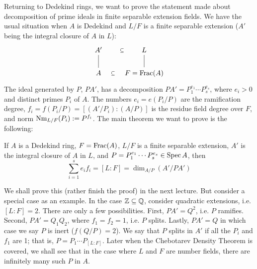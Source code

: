 Returning to Dedekind rings, we want to prove the statement made about decomposition of prime ideals in finite separable extension fields. We have the usual situation when $A$ is Dedekind and $L/F$ is a finite separable extension ($A'$ being the integral closure of $A$ in $L$):
	\[
	\begin{tikzcd}
	A' \arrow[draw=none]{r}[sloped,auto=false]{\subseteq} \arrow[dash]{d} & L \arrow[dash]{d}\\
	A \arrow[draw=none]{r}[sloped,auto=false]{\subseteq} & F=\Frac(A)
	\end{tikzcd}
	\]
The ideal generated by $P$, $PA'$, has a decomposition $PA'=P_1^{e_1}\cdots P_s^{e_s}$, where $e_i>0$ and distinct primes $P_i$ of $A$. The numbers $e_i=e(P_i/P)$ are the ramification degree, $f_i=f(P_i/P)=[(A'/P_i) \colon (A/P)]$ is the residue field degree over $F$, and norm $\text{Nm}_{L/F}(P_i):= P^{f_i}$. The main theorem we want to prove is the following:

\begin{thm}
If $A$ is a Dedekind ring, $F=\operatorname{Frac}(A)$, $L/F$ is a finite separable extension, $A'$ is the integral closure of $A$ in $L$, and $P=P_1^{e_1}\cdots P_s^{e_s} \in \operatorname{Spec} A$, then
	\[
	\sum_{i=1}^s e_if_i = [L:F]=\dim_{A/P}(A'/PA')
	\]
\end{thm}

We shall prove this (rather finish the proof) in the next lecture. But consider a special case as an example. In the case $\mathbb{Z} \subseteq \mathbb{Q}$, consider quadratic extensions, i.e. $[L:F]=2$. There are only a few possibilities. First, $PA'=Q^2$, i.e. $P$ ramifies. Second, $PA'=Q_1Q_2$, where $f_1=f_2=1$, i.e. $P$ splits. Lastly, $PA'=Q$ in which case we say $P$ is inert ($f(Q/P)=2$). We say that $P$ splits in $A'$ if all the $P_i$ and $f_1$ are 1; that is, $P=P_1 \cdots P_{[L:F]}$. Later when the Chebotarev Density Theorem is covered, we shall see that in the case where $L$ and $F$ are number fields, there are infinitely many such $P$ in $A$.

